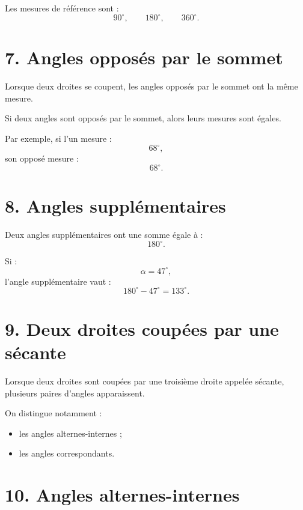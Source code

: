 Les mesures de référence sont :
\[
90^\circ,\qquad180^\circ,\qquad360^\circ.
\]

\section{7. Angles opposés par le sommet}

Lorsque deux droites se coupent, les angles opposés par le sommet ont la même mesure.

\begin{propriete}
Si deux angles sont opposés par le sommet, alors leurs mesures sont égales.
\end{propriete}

Par exemple, si l'un mesure :
\[
68^\circ,
\]
son opposé mesure :
\[
68^\circ.
\]

\section{8. Angles supplémentaires}

Deux angles supplémentaires ont une somme égale à :
\[
180^\circ.
\]

Si :
\[
\alpha=47^\circ,
\]
l'angle supplémentaire vaut :
\[
180^\circ-47^\circ=133^\circ.
\]

\section{9. Deux droites coupées par une sécante}

Lorsque deux droites sont coupées par une troisième droite appelée sécante, plusieurs paires d'angles apparaissent.

On distingue notamment :
\begin{itemize}
\item les angles alternes-internes ;
\item les angles correspondants.
\end{itemize}


\section{10. Angles alternes-internes}

